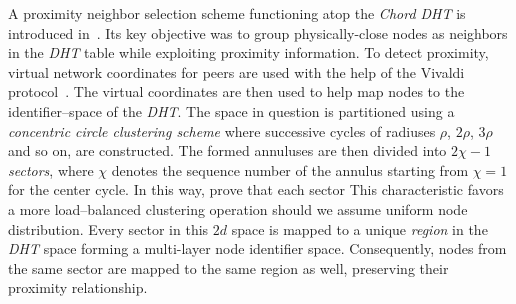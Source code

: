 
A proximity neighbor selection scheme functioning atop 
the \emph{Chord DHT} is introduced in~\cite{DLTZZ2006}.
Its key objective was to group physically-close nodes as 
neighbors in the \emph{DHT} table while exploiting proximity information.
To detect proximity, virtual network coordinates for 
peers are used with the help of the Vivaldi protocol~\cite{cox_vivaldi_2004}. 
The virtual coordinates are then used to help map nodes to 
the identifier--space of the \emph{DHT}.
The space in question is partitioned using a 
\emph{concentric circle clustering scheme} where successive cycles of
radiuses $\rho$, $2\rho$, $3\rho$ and so on, are constructed. 
The formed annuluses are then divided into 
$2\chi-1$ \emph{sectors}, where $\chi$ denotes the
sequence number of the annulus starting from $\chi = 1$ 
for the center cycle. 
In this way, 
\cite{DLTZZ2006} prove that each sector
This characteristic favors a more load--balanced clustering operation
should we assume uniform node distribution.
Every sector in this $2d$ space is mapped to 
a unique \emph{region} in the \emph{DHT} space forming a
multi-layer node identifier space.  
Consequently, nodes from the same
sector are mapped to the same region as well, 
preserving their proximity relationship. 

